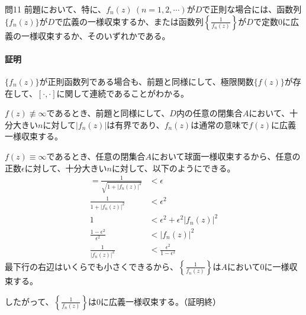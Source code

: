 %

\newpage
\begin{mysimplebox}{問11}
   前題において、特に、$f_n(z)\ (n=1,2,\cdots)$が$D$で正則な場合には、函数列$\{f_n(z)\}$が$D$で広義の一様収束するか、または函数列$\left\{\frac{1}{f_n(z)}\right\}$が$D$で定数0に広義の一様収束するか、そのいずれかである。
\end{mysimplebox}
\paragraph{証明}
$\{f_n(z)\}$が正則函数列である場合も、前題と同様にして、極限関数$\{f(z)\}$が存在して、$[\cdot,\cdot]$に関して連続であることがわかる。

$f(z)\not\equiv\infty$であるとき、前題と同様にして、$D$内の任意の閉集合$A$において、十分大きい$n$に対して$|f_n(z)|$は有界であり、$f_n(z)$は通常の意味で$f(z)$に広義一様収束する。

$f(z)\equiv\infty$であるとき、任意の閉集合$A$において球面一様収束するから、任意の正数$\epsilon$に対して、十分大きい$n$に対して、以下のようにできる。
\begin{align*}
    [f_n(z),\infty]
    =\frac{1}{\sqrt{1+|f_n(z)|^2}}
    &<\epsilon\\
    \frac{1}{1+|f_n(z)|^2}
    &<\epsilon^2\\
    1&<\epsilon^2+\epsilon^2|f_n(z)|^2\\
    \frac{1-\epsilon^2}{\epsilon^2}&<|f_n(z)|^2\\
    \frac{1}{|f_n(z)|^2}&<\frac{\epsilon^2}{1-\epsilon^2}
\end{align*}
最下行の右辺はいくらでも小さくできるから、$\left\{\frac{1}{f_n(z)}\right\}$は$A$において0に一様収束する。

したがって、$\left\{\frac{1}{f_n(z)}\right\}$は0に広義一様収束する。（証明終）